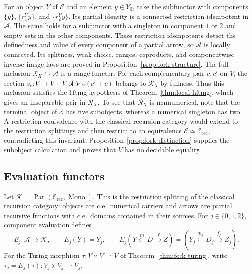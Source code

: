 \documentclass[11pt]{article}
\begin{document}
For an object $Y$ of $\mathcal E$ and an element $y\in Y_0$, take
the subfunctor with components $\{y\}$, $\{r_1^Yy\}$, and
$\{r_2^Yy\}$. Its partial identity is a connected restriction
idempotent in $\mathcal A$. The same holds for a subfunctor with
a singleton in component $1$ or $2$ and empty sets in the other
components. These restriction idempotents detect the definedness and value
of every component of a partial arrow, so $\mathcal A$ is locally
connected. Its splitness, weak choice, ranges, coproducts, and
componentwise inverse-image laws are proved in
Proposition~\ref{prop:fork-structure}.
The full inclusion $\mathscr R_X\hookrightarrow\mathcal A$ is a
range functor.
For each complementary pair $c,c'$ on $V$, the section
$s_c:V\to V+V$ of $\nabla_V(c'+c)$ belongs to $\mathscr R_X$
by fullness. Thus this inclusion satisfies the lifting hypothesis of
Theorem~\ref{thm:local-lifting}, which gives an inseparable pair in
$\mathscr R_X$.
To see that $\mathscr R_X$ is nonnumerical, note that the terminal
object of $\mathcal E$ has five subobjects,
whereas a numerical singleton has two.
A restriction equivalence with the classical recursion category
would extend to the restriction splittings and then restrict to an
equivalence $\mathcal E\simeq\mathcal C_{\mathrm{rec}}$, contradicting
this invariant. Proposition~\ref{prop:fork-distinction} supplies the
subobject calculation and proves that $V$ has no decidable equality.

\subsection{Evaluation functors}

Let
$\mathcal K=\operatorname{Par}(\mathcal C_{\mathrm{rec}},\operatorname{Mono})$.
This is the restriction splitting of the classical recursion category:
objects are c.e.\ numerical carriers and arrows are partial recursive
functions with c.e.\ domains contained in their sources.
For $j\in\{0,1,2\}$, component evaluation defines
\begin{equation}\label{eq:endpoint-functor}
 E_j:\mathcal A\longrightarrow\mathcal K,\qquad
 E_j(Y)=Y_j,\qquad
 E_j(Y\xleftarrow{m}D\xrightarrow{f}Z)
   =(Y_j\xleftarrow{m_j}D_j\xrightarrow{f_j}Z_j).
\end{equation}
For the Turing morphism $\tau:V\times V\rightharpoonup V$ of
Theorem~\ref{thm:fork-turing}, write
$\tau_j=E_j(\tau):V_j\times V_j\rightharpoonup V_j$.
\end{document}
